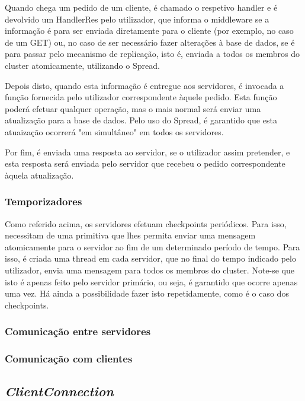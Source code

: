 \documentclass[a4paper]{report}
\begin{document}
{				Quando chega um pedido de um cliente, é chamado o respetivo handler e é devolvido um HandlerRes pelo utilizador, que informa o middleware se a informação é para ser enviada diretamente para o cliente (por exemplo, no caso de um GET) ou, no caso de ser necessário fazer alterações à base de dados, se é para passar pelo mecanismo de replicação, isto é, enviada a todos os membros do cluster atomicamente, utilizando o Spread.
				
				Depois disto, quando esta informação é entregue aos servidores, é invocada a função fornecida pelo utilizador correspondente àquele pedido. Esta função poderá efetuar qualquer operação, mas o mais normal será enviar uma atualização para a base de dados. Pelo uso do Spread, é garantido que esta atuaização ocorrerá "em simultâneo" em todos os servidores.
				
				Por fim, é enviada uma resposta ao servidor, se o utilizador assim pretender, e esta resposta será enviada pelo servidor que recebeu o pedido correspondente àquela atualização.

			\subsubsection{Temporizadores} \label{sssec:Timers}
				Como referido acima, os servidores efetuam checkpoints periódicos. Para isso, necessitam de uma primitiva que lhes permita enviar uma mensagem atomicamente para o servidor ao fim de um determinado período de tempo. Para isso, é criada uma thread em cada servidor, que no final do tempo indicado pelo utilizador, envia uma mensagem para todos os membros do cluster. Note-se que isto é apenas feito pelo servidor primário, ou seja, é garantido que ocorre apenas uma vez. Há ainda a possibilidade fazer isto repetidamente, como é o caso dos checkpoints.

			\subsubsection{Comunicação entre servidores} \label{sssec:ServerCommunication}
			\subsubsection{Comunicação com clientes} \label{sssec:ClientCommunication}
		\subsection{\textit{ClientConnection}} \label{subsec:ClientConnection}
	
}
\end{document}
